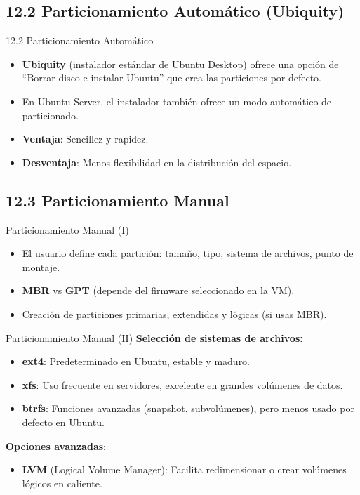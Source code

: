 \documentclass{beamer}
\begin{document}
\subsection{12.2 Particionamiento Automático (Ubiquity)}
\begin{frame}{12.2 Particionamiento Automático}
	\begin{itemize}
		\item \textbf{Ubiquity} (instalador estándar de Ubuntu Desktop) ofrece una opción de “Borrar disco e instalar Ubuntu” que crea las particiones por defecto.
		\item En Ubuntu Server, el instalador también ofrece un modo automático de particionado.
		\item \textbf{Ventaja}: Sencillez y rapidez.
		\item \textbf{Desventaja}: Menos flexibilidad en la distribución del espacio.
	\end{itemize}
\end{frame}

\subsection{12.3 Particionamiento Manual}
\begin{frame}{Particionamiento Manual (I)}
	\begin{itemize}
		\item El usuario define cada partición: tamaño, tipo, sistema de archivos, punto de montaje.
		\item \textbf{MBR} vs \textbf{GPT} (depende del firmware seleccionado en la VM).
		\item Creación de particiones primarias, extendidas y lógicas (si usas MBR).
	\end{itemize}
\end{frame}

\begin{frame}{Particionamiento Manual (II)}
	\textbf{Selección de sistemas de archivos:}
	\begin{itemize}
		\item \textbf{ext4}: Predeterminado en Ubuntu, estable y maduro.
		\item \textbf{xfs}: Uso frecuente en servidores, excelente en grandes volúmenes de datos.
		\item \textbf{btrfs}: Funciones avanzadas (snapshot, subvolúmenes), pero menos usado por defecto en Ubuntu.
	\end{itemize}
	\vspace{0.2cm}
	\textbf{Opciones avanzadas}:
	\begin{itemize}
		\item \textbf{LVM} (Logical Volume Manager): Facilita redimensionar o crear volúmenes lógicos en caliente.
	\end{itemize}
\end{frame}
\end{document}
